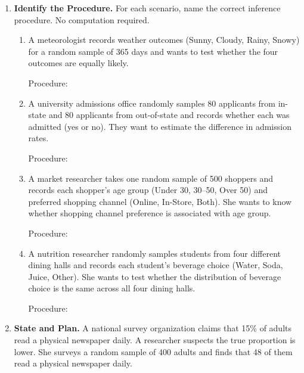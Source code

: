 \documentclass[10pt]{article}
\begin{document}
\namedateperiod

\vspace{0.10in}

\begin{enumerate}

\item \textbf{Identify the Procedure.} \; For each scenario, name the correct inference
      procedure. No computation required.

\begin{enumerate}[label=\alph*.]
  \item A meteorologist records weather outcomes (Sunny, Cloudy, Rainy, Snowy) for a random
        sample of 365 days and wants to test whether the four outcomes are equally likely.

        Procedure: 

  \item A university admissions office randomly samples 80 applicants from in-state and 80
        applicants from out-of-state and records whether each was admitted (yes or no). They
        want to estimate the difference in admission rates.

        Procedure: 

  \item A market researcher takes one random sample of 500 shoppers and records each shopper's
        age group (Under 30, 30--50, Over 50) and preferred shopping channel (Online, In-Store,
        Both). She wants to know whether shopping channel preference is associated with age group.

        Procedure: 

  \item A nutrition researcher randomly samples students from four different dining halls and
        records each student's beverage choice (Water, Soda, Juice, Other). She wants to test
        whether the distribution of beverage choice is the same across all four dining halls.

        Procedure: 
\end{enumerate}

\vspace{0.10in}

\item \textbf{State and Plan.} \;
      A national survey organization claims that 15\% of adults read a physical newspaper daily.
      A researcher suspects the true proportion is lower. She surveys a random sample of 400 adults
      and finds that 48 of them read a physical newspaper daily.


\end{enumerate}
\end{document}
